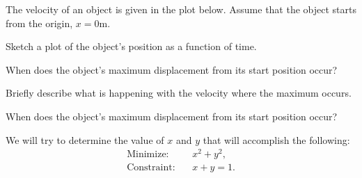 \begin{problem}
\item The velocity of an object is given in the plot below. Assume
  that the object starts from the origin, $x=0$m. \\
  \scalebox{0.7}{}
  \begin{subproblem}
  \item Sketch a plot of the object's position as a function of time.
  \item When does the object's maximum displacement from its start
    position occur?
    \vspace{3em}
  \item Briefly describe what is happening with the velocity where the
    maximum occurs.
    \vfill
  \item When does the object's maximum displacement from its start
    position occur?
    \vspace{3em}
  \end{subproblem}

  \clearpage

\item We will try to determine the value of $x$ and $y$ that will
  accomplish the following:
  \begin{eqnarray*}
    \mathrm{Minimize:} & & x^2 + y^2, \\
    \mathrm{Constraint:} & & x + y = 1.
  \end{eqnarray*}
  \label{optimizationMax}

  \vspace{-2.5em}
  \scalebox{0.6}{}


\end{problem}
